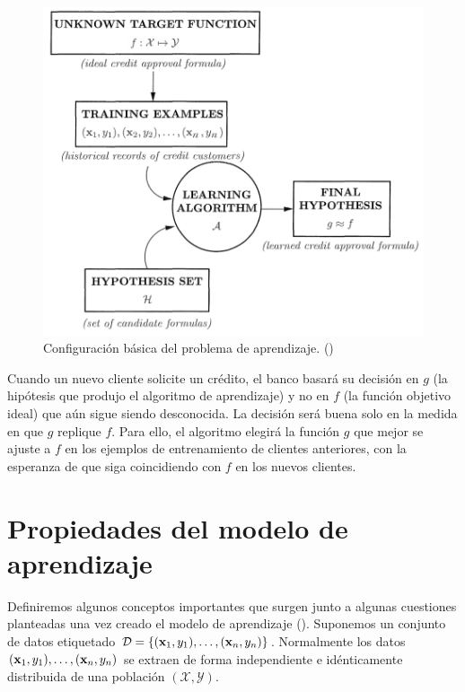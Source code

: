 \documentclass[oneside,openright,titlepage,numbers=noenddot,openany,headinclude,footinclude=true,
cleardoublepage=empty,abstractoff,BCOR=5mm,paper=a4,fontsize=12pt,main=spanish]{scrreprt}
\begin{document}
\begin{figure}[h]
	\centering
	\includegraphics[width=12.6cm]{setup_learning.png}
	\caption{Configuración básica del problema de aprendizaje. (\cite{learning2012})}
    \label{fig:learningesq}
\end{figure}

\clearpage

Cuando un nuevo cliente solicite un crédito, el banco basará su decisión en $g$ (la hipótesis que produjo el algoritmo de aprendizaje) y no en $f$ (la función objetivo ideal) que aún sigue siendo desconocida. La decisión será buena solo en la medida en que $g$ replique $f$. Para ello, el algoritmo elegirá la función $g$ que mejor se ajuste a $f$ en los ejemplos de entrenamiento de clientes anteriores, con la esperanza de que siga coincidiendo con $f$ en los nuevos clientes.

\section{Propiedades del modelo de aprendizaje}

Definiremos algunos conceptos importantes que surgen junto a algunas cuestiones planteadas una vez creado el modelo de aprendizaje (\cite{fairnesslearning2019}). Suponemos un conjunto de datos etiquetado $\mathcal{D}=\{(\textbf{x}_1,y_1),\dots,(\textbf{x}_n,y_n)\}$. Normalmente los datos $(\textbf{x}_1, y_1),\dots, (\textbf{x}_n, y_n)$ se extraen de forma independiente e idénticamente distribuida de una población $(\mathcal{X},\mathcal{Y})$.\\
\end{document}
